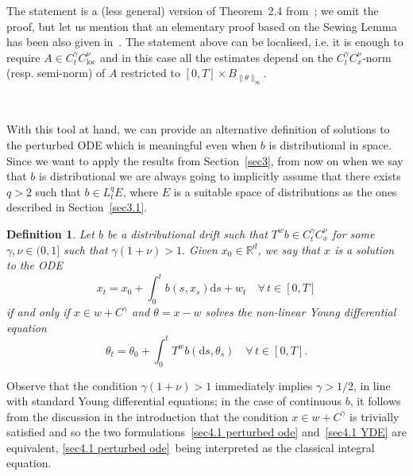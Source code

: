 \documentclass[10pt]{article}
\newcommand{\mathd}{\mathrm{d}}
\newcommand{\tmop}[1]{\ensuremath{\operatorname{#1}}}
\newtheorem{definition}{Definition}
\begin{document}
The statement is a (less general) version of Theorem~2.4
from~{\cite{catelliergubinelli}}; we omit the proof, but let us mention that
an elementary proof based on the Sewing Lemma has been also given
in~{\cite{hu}}. The statement above can be localised, i.e. it is enough to
require $A \in C^{\gamma}_t C^{\nu}_{\tmop{loc}}$ and in this case all the
estimates depend on the $C^{\gamma}_t C^{\nu}_x$\mbox{-}norm (resp. semi-norm)
of $A$ restricted to $[0, T] \times B_{\| \theta \|_{\infty}}$.

\

With this tool at hand, we can provide an alternative definition of
solutions to the perturbed ODE which is meaningful even when $b$ is
distributional in space. Since we want to apply the results from
Section~\ref{sec3}, from now on when we say that $b$ is distributional we are
always going to implicitly assume that there exists $q > 2$ such that $b \in
L^q_t E$, where $E$ is a suitable space of distributions as the ones described
in Section~\ref{sec3.1}.

\begin{definition}
  \label{sec4.1 defn solution}Let $b$ be a distributional drift such that $T^w
  b \in C^{\gamma}_t C_x^{\nu}$ for some $\gamma, \nu \in (0, 1]$ such that
  $\gamma (1 + \nu) > 1.$ Given $x_0 \in \mathbb{R}^d$, we say that $x$ is a
  solution to the ODE
  \begin{equation}
    x_t = x_0 + \int_0^t b (s, x_s) \mathd s + w_t \quad \forall \, t \in [0,
    T] \label{sec4.1 perturbed ode}
  \end{equation}
  if and only if $x \in w + C^{\gamma}$ and $\theta = x - w$ solves the
  non-linear Young differential equation
  \begin{equation}
    \theta_t = \theta_0 + \int_0^t T^w b (\mathd s, \theta_s) \quad \forall \,
    t \in [0, T] . \label{sec4.1 YDE}
  \end{equation}
\end{definition}

Observe that the condition $\gamma (1 + \nu) > 1$ immediately implies $\gamma
> 1 / 2$, in line with standard Young differential equations; in the case of
continuous $b$, it follows from the discussion in the introduction that the
condition $x \in w + C^{\gamma}$ is trivially satisfied and so the two
formulations~{\eqref{sec4.1 perturbed ode}} and~{\eqref{sec4.1 YDE}} are
equivalent, {\eqref{sec4.1 perturbed ode}}~being interpreted as the classical
integral equation.
\end{document}
